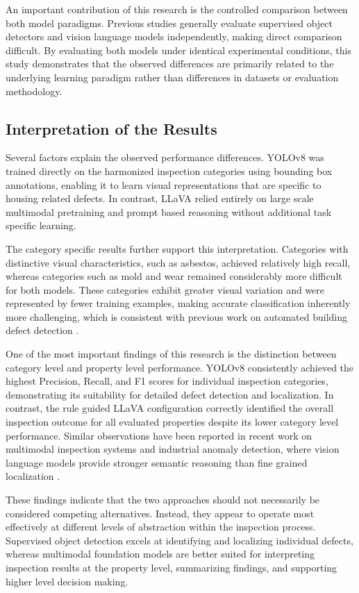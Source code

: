 An important contribution of this research is the controlled comparison between both model paradigms. Previous studies generally evaluate supervised object detectors and vision language models independently, making direct comparison difficult. By evaluating both models under identical experimental conditions, this study demonstrates that the observed differences are primarily related to the underlying learning paradigm rather than differences in datasets or evaluation methodology.

\subsection{Interpretation of the Results}

Several factors explain the observed performance differences. YOLOv8 was trained directly on the harmonized inspection categories using bounding box annotations, enabling it to learn visual representations that are specific to housing related defects. In contrast, LLaVA relied entirely on large scale multimodal pretraining and prompt based reasoning without additional task specific learning.

The category specific results further support this interpretation. Categories with distinctive visual characteristics, such as asbestos, achieved relatively high recall, whereas categories such as mold and wear remained considerably more difficult for both models. These categories exhibit greater visual variation and were represented by fewer training examples, making accurate classification inherently more challenging, which is consistent with previous work on automated building defect detection \cite{kang_improvement_2025}.

One of the most important findings of this research is the distinction between category level and property level performance. YOLOv8 consistently achieved the highest Precision, Recall, and F1 scores for individual inspection categories, demonstrating its suitability for detailed defect detection and localization. In contrast, the rule guided LLaVA configuration correctly identified the overall inspection outcome for all evaluated properties despite its lower category level performance. Similar observations have been reported in recent work on multimodal inspection systems and industrial anomaly detection, where vision language models provide stronger semantic reasoning than fine grained localization \cite{jiang_mmad_2025,malla_enhancing_2025}.

These findings indicate that the two approaches should not necessarily be considered competing alternatives. Instead, they appear to operate most effectively at different levels of abstraction within the inspection process. Supervised object detection excels at identifying and localizing individual defects, whereas multimodal foundation models are better suited for interpreting inspection results at the property level, summarizing findings, and supporting higher level decision making.

